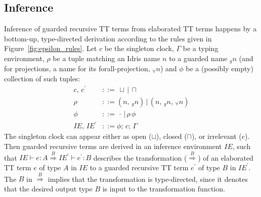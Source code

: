 \subsection{Inference}


Inference of guarded recursive TT terms from elaborated TT terms happens by a
bottom-up, type-directed derivation according to the rules given in Figure~\ref{fig:epsilon_rules}. Let
$c$ be the singleton clock, $\Gamma$ be a typing environment, $\rho$ be a tuple matching an Idris name $n$ to a
guarded name $_gn$ (and for projections, a name for its forall-projection, $_{\forall}n$) and $\phi$ be a (possibly empty) collection of such tuples:
\begin{align*}
   c,\,c^\prime &::=\,\sqcup\,|\,\sqcap \\
   \rho &::= (n,\, _gn)\,|\,(n,\, _gn,\, _{\forall}n)  \\
   \phi &::=\,\cdot\,|\,\rho\,\phi \\
   IE,\,IE^\prime &::= \phi;\,c;\,\Gamma
\end{align*}
The singleton clock can appear either as open ($\sqcup$), closed ($\sqcap$), or
irrelevant ($c$). Then guarded recursive terms are derived in an inference environment $IE$, such that
${IE\vdash e : A \overset{B}{\Longrightarrow} IE^\prime \vdash e^\prime : B}$ describes the
transformation ($\overset{B}{\Longrightarrow}$) of an elaborated TT term $e$ of type
$A$ in $IE$ to a guarded recursive TT term $e^\prime$ of type $B$ in
$IE^\prime$. The $B$ in $\overset{B}{\Longrightarrow}$ implies that the transformation
is type-directed, since it denotes that the desired output type $B$ is input to
the transformation function.

